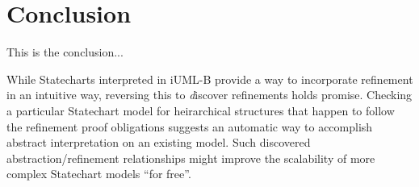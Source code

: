 
\section{Conclusion}
\label{sec:conclusion}
This is the conclusion...


While Statecharts interpreted in iUML-B provide a way to incorporate
refinement in an intuitive way, reversing this to {\emph discover}
refinements holds promise.  Checking a particular Statechart model for
heirarchical structures that happen to follow the refinement proof
obligations suggests an automatic way to accomplish abstract
interpretation on an existing model.  Such discovered
abstraction/refinement relationships might improve the scalability of
more complex Statechart models ``for free''.
